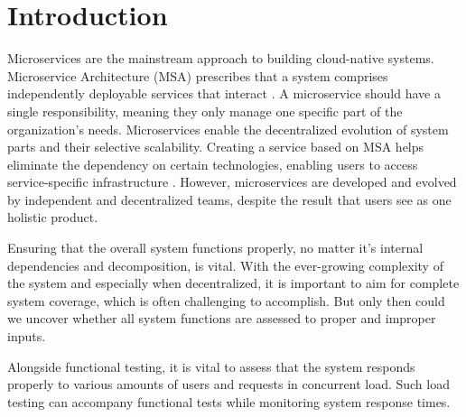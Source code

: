 \section{Introduction} \label{sec:introduction}

Microservices are the mainstream approach to building cloud-native systems. Microservice Architecture (MSA) prescribes that a system comprises independently deployable services that interact
\cite{lewis2014microservices}. A microservice should have a single responsibility, meaning they only manage one specific part of the organization's needs. Microservices enable the decentralized evolution of system parts and their selective scalability.
Creating a service based on MSA helps eliminate the dependency on certain technologies, enabling users to access service-specific infrastructure \cite{cerny2018contextual}. However, microservices are developed and evolved by independent and decentralized teams, despite the result that users see as one holistic product.

Ensuring that the overall system functions properly, no matter it's internal dependencies and decomposition, is vital. With the ever-growing complexity of the system and especially when decentralized, it is important to aim for complete system coverage, which is often challenging to accomplish. But only then could we uncover whether all system functions are assessed to proper and improper inputs. 

Alongside functional testing, it is vital to assess that the system responds properly to various amounts of users and requests in concurrent load. Such load testing can accompany functional tests while monitoring system response times.


